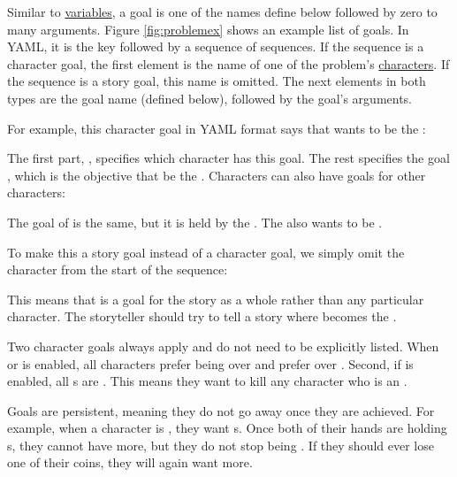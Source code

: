 \documentclass{nilreport}
\begin{document}
Similar to \hyperref[sec:variables]{variables}, a goal is one of the names define below followed by zero to many arguments. Figure \ref{fig:problemex} shows an example list of goals. In YAML, it is the key  followed by a sequence of sequences. If the sequence is a character goal, the first element is the name of one of the problem's \hyperref[sec:characters]{characters}. If the sequence is a story goal, this name is omitted. The next elements in both types are the goal name (defined below), followed by the goal's arguments.

For example, this character goal in YAML format says that  wants  to be the :

\centerline{}

\noindent The first part, , specifies which character has this goal. The rest specifies the goal , which is the objective that  be the . Characters can also have goals for other characters:

\centerline{}

\noindent The goal of  is the same, but it is held by the . The  also wants  to be .

To make this a story goal instead of a character goal, we simply omit the character from the start of the sequence:

\centerline{}

\noindent This means that  is a goal for the story as a whole rather than any particular character. The storyteller should try to tell a story where  becomes the .

Two character goals always apply and do not need to be explicitly listed. When  or  is enabled, all characters prefer being  over  and prefer  over . Second, if  is enabled, all s are . This means they want to kill any character who is an .

Goals are persistent, meaning they do not go away once they are achieved. For example, when a character is , they want s. Once both of their hands are holding s, they cannot have more, but they do not stop being . If they should ever lose one of their coins, they will again want more.
\end{document}
